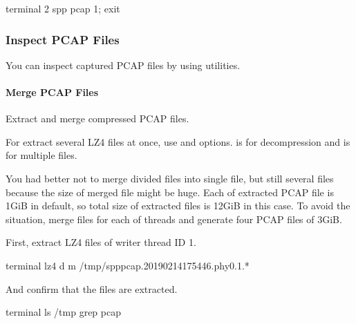 \documentclass[a4paper,11pt,openany,oneside,english]{sphinxmanual}
\begin{document}
\begin{sphinxVerbatim}[commandchars=\\\{\},formatcom=\footnotesize]
\PYGZsh{} terminal 2
spp \PYGZgt{} pcap 1; exit
\end{sphinxVerbatim}


\subsubsection{Inspect PCAP Files}
\label{\detokenize{usecases/spp_pcap:inspect-pcap-files}}\label{\detokenize{usecases/spp_pcap:spp-pcap-use-case-inspect-file}}
You can inspect captured PCAP files by using utilities.


\paragraph{Merge PCAP Files}
\label{\detokenize{usecases/spp_pcap:merge-pcap-files}}
Extract and merge compressed PCAP files.

For extract several LZ4 files at once, use  and  options.
 is for decompression and  is for multiple files.

You had better not to merge divided files into single file, but still
several files because the size of merged file might be huge.
Each of extracted PCAP file is 1GiB in default, so total size of extracted
files is 12GiB in this case. To avoid the situation, merge files for each of
threads and generate four PCAP files of 3GiB.

First, extract LZ4 files of writer thread ID 1.

\begin{sphinxVerbatim}[commandchars=\\\{\},formatcom=\footnotesize]
 terminal 
 lz4 \PYGZhy{}d \PYGZhy{}m /tmp/spp\PYGZus{}pcap.20190214175446.phy0.1.*
\end{sphinxVerbatim}

And confirm that the files are extracted.

\begin{sphinxVerbatim}[commandchars=\\\{\},formatcom=\footnotesize]
 terminal 
 ls /tmp  grep pcap\PYGZdl{}
\end{sphinxVerbatim}
\end{document}
